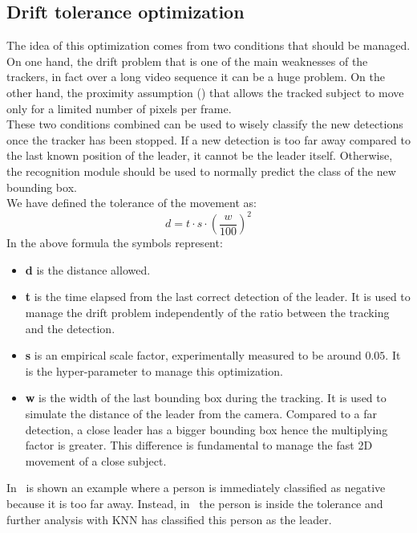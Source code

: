 \subsection{Drift tolerance optimization} \label{sec:driftOptimization}
The idea of this optimization comes from two conditions that should be managed. On one hand, the drift problem that is one of the main weaknesses of the trackers, in fact over a long video sequence it can be a huge problem. On the other hand, the proximity assumption () that allows the tracked subject to move only for a limited number of pixels per frame.\\
These two conditions combined can be used to wisely classify the new detections once the tracker has been stopped. If a new detection is too far away compared to the last known position of the leader, it cannot be the leader itself. Otherwise, the recognition module should be used to normally predict the class of the new bounding box.\\
We have defined the tolerance of the movement as:
$$d = t\cdot s\cdot\left(\frac{w}{100}\right)^{2}$$
In the above formula the symbols represent:
\begin{itemize}
	\item \textbf{d} is the distance allowed.
	\item \textbf{t} is the time elapsed from the last correct detection of the leader. It is used to manage the drift problem independently of the ratio between the tracking and the detection.
	\item \textbf{s} is an empirical scale factor, experimentally measured to be around $0.05$. It is the hyper-parameter to manage this optimization. 
	\item \textbf{w} is the width of the last bounding box during the tracking. It is used to simulate the distance of the leader from the camera. Compared to a far detection, a close leader has a bigger bounding box hence the multiplying factor is greater. This difference is fundamental to manage the fast 2D movement of a close subject.
\end{itemize}
In~ is shown an example where a person is immediately classified as negative because it is too far away. Instead, in~ the person is inside the tolerance and further analysis with KNN has classified this person as the leader.

